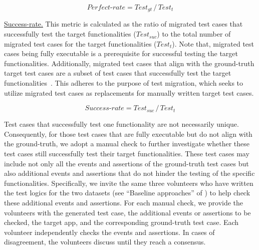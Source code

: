 \begin{equation}
\textit{Perfect-rate} = \textit{Test}_\textit{gt}\,/\,\textit{Test}_\textit{t}
\end{equation}



\underline{Success-rate.} This metric is calculated as the ratio of migrated test cases that successfully test the target functionalities ($Test_{suc}$) to the total number of migrated test cases for the target functionalities ($Test_t$). Note that, migrated test cases being fully executable is a prerequisite for successful testing the target functionalities. Additionally, 
migrated test cases that align with the ground-truth target test cases are a subset of test cases that successfully test the target functionalities~\cite{zhao2020fruiter,lin2022gui, liu2023test}. This adheres to the purpose of test migration, which seeks to utilize migrated test cases as replacements for manually written target test cases.


\begin{equation}
\textit{Success-rate} = \textit{Test}_\textit{suc}\,/\,\textit{Test}_\textit{t}
\end{equation}



Test cases that successfully test one functionality are not necessarily unique. Consequently, for those test cases that are fully executable but do not align with the ground-truth, we adopt a manual check to further investigate whether these test cases still successfully test their target functionalities. These test cases may include not only all the events and assertions of the ground-truth test cases but also additional events and assertions that do not hinder the testing of the specific functionalities. Specifically, we invite the same three volunteers who have written the test logics for the two datasets (see ``Baseline approaches'' of ) to help check these additional events and assertions. For each manual check, we provide the volunteers with the generated test case, the additional events or assertions to be checked, the target app, and the corresponding ground-truth test case. Each volunteer independently checks the events and assertions. In cases of disagreement, the volunteers discuss until they reach a consensus.



